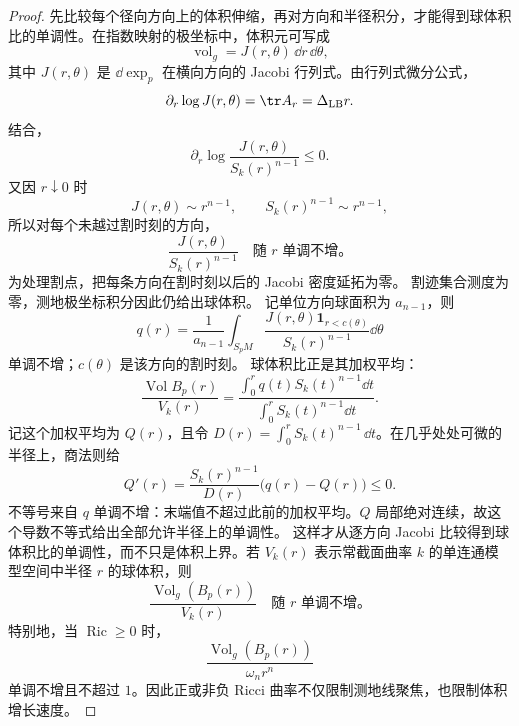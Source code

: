 \begin{proof}
先比较每个径向方向上的体积伸缩，再对方向和半径积分，才能得到球体积比的单调性。在指数映射的极坐标中，体积元可写成
\[
\operatorname{vol}_g=J(r,\theta)\,\dd r\,\dd\theta,
\]
其中 $J(r,\theta)$ 是 $\dd\exp_p$ 在横向方向的 Jacobi 行列式。由行列式微分公式，
\[
\partial_r\log J(r,\theta)
=\tr A_r
=\Delta_{\mathrm{LB}} r.
\]
结合，
\[
\partial_r
\log\frac{J(r,\theta)}{S_k(r)^{n-1}}
\le0.
\]
又因 $r\downarrow0$ 时
\[
J(r,\theta)\sim r^{n-1},
\qquad
S_k(r)^{n-1}\sim r^{n-1},
\]
所以对每个未越过割时刻的方向，
\begin{equation}
\frac{J(r,\theta)}{S_k(r)^{n-1}}
\quad\text{随 $r$ 单调不增。}
\label{eq:math-dg-jacobian-comparison}
\end{equation}
为处理割点，把每条方向在割时刻以后的 Jacobi 密度延拓为零。
割迹集合测度为零，测地极坐标积分因此仍给出球体积。
记单位方向球面积为 $a_{n-1}$，则
\[
q(r)=\frac1{a_{n-1}}\int_{S_pM}
\frac{J(r,\theta)\mathbf1_{r<c(\theta)}}{S_k(r)^{n-1}}\dd\theta
\]
单调不增；$c(\theta)$ 是该方向的割时刻。
球体积比正是其加权平均：
\[
\frac{\operatorname{Vol}B_p(r)}{V_k(r)}
=\frac{\int_0^r q(t)S_k(t)^{n-1}\dd t}
{\int_0^r S_k(t)^{n-1}\dd t}.
\]
记这个加权平均为 $Q(r)$，且令 $D(r)=\int_0^rS_k(t)^{n-1}\,\dd t$。在几乎处处可微的半径上，商法则给
\[
Q'(r)=\frac{S_k(r)^{n-1}}{D(r)}\bigl(q(r)-Q(r)\bigr)\le0.
\]
不等号来自 $q$ 单调不增：末端值不超过此前的加权平均。$Q$ 局部绝对连续，故这个导数不等式给出全部允许半径上的单调性。
这样才从逐方向 Jacobi 比较得到球体积比的单调性，而不只是体积上界。若 $V_k(r)$ 表示常截面曲率 $k$ 的单连通模型空间中半径 $r$ 的球体积，则
\begin{equation}
\boxed{
\frac{\operatorname{Vol}_g(B_p(r))}{V_k(r)}
\quad\text{随 $r$ 单调不增。}
}
\label{eq:math-dg-bishop-gromov}
\end{equation}
特别地，当 $\operatorname{Ric}\ge0$ 时，
\[
\frac{\operatorname{Vol}_g(B_p(r))}{\omega_n r^n}
\]
单调不增且不超过 $1$。因此正或非负 Ricci 曲率不仅限制测地线聚焦，也限制体积增长速度。
\end{proof}
